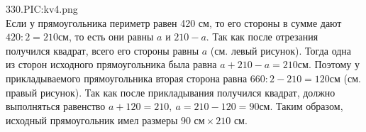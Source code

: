330.{{PIC:kv4.png}}\\
Если у прямоугольника периметр равен 420 см, то его стороны в сумме дают $420:2=210$см, то есть они равны $a$ и $210-a.$ Так как после отрезания получился квадрат, всего его стороны равны $a$ (см. левый рисунок). Тогда одна из сторон исходного прямоугольника была равна $a+210-a=210$см. Поэтому у прикладываемого прямоугольника вторая сторона равна $660:2-210=120$см (см. правый рисунок). Так как после прикладывания получился квадрат, должно выполняться равенство $a+120=210,\ a=210-120=90$см. Таким образом, исходный прямоугольник имел размеры $90\text{ см}\times210\text{ см}.$\\
